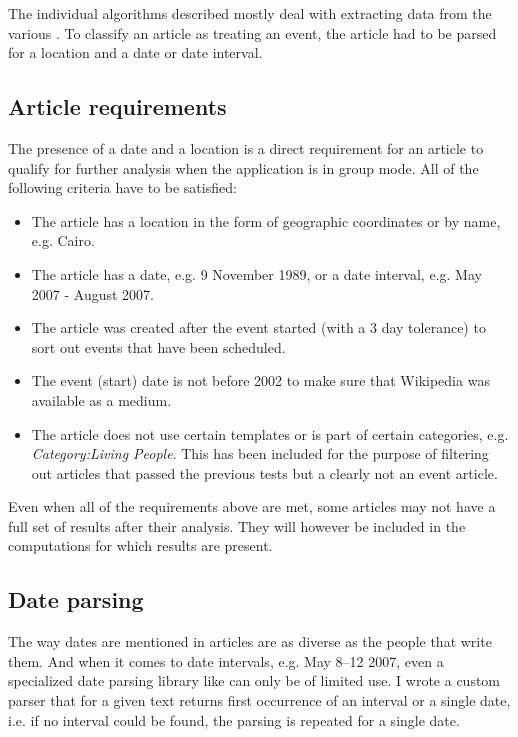The individual algorithms described mostly deal with extracting data from the various .
To classify an article as treating an event, the article had to be parsed for a location and a date or date interval.

\subsection{Article requirements}

The presence of a date and a location is a direct requirement for an article to qualify for further analysis when the application is in group mode.
All of the following criteria have to be satisfied:

\begin{itemize}
  \item The article has a location in the form of geographic coordinates or by name, e.g. Cairo.
  \item The article has a date, e.g. 9 November 1989, or a date interval, e.g. May 2007 - August 2007.
  \item The article was created after the event started (with a 3 day tolerance) to sort out events that have been scheduled.
  \item The event (start) date is not before 2002 to make sure that Wikipedia was available as a medium. 
  \item The article does not use certain templates or is part of certain categories, e.g. \emph{Category:Living People}.
  This has been included for the purpose of filtering out articles that passed the previous tests but a clearly not an event article. 
\end{itemize}

Even when all of the requirements above are met, some articles may not have a full set of results after their analysis.
They will however be included in the computations for which results are present.

\subsection{Date parsing}

The way dates are mentioned in articles are as diverse as the people that write them.
And when it comes to date intervals, e.g. May 8--12 2007, even a specialized date parsing library like  can only be of limited use.
I wrote a custom parser that for a given text returns first occurrence of an interval or a single date, i.e. if no interval could be found, the parsing is repeated for a single date.

